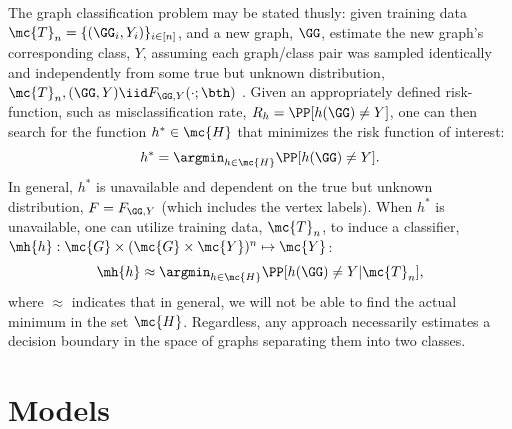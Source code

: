 \documentclass[10pt,journal,cspaper,compsoc]{IEEEtran}
\begin{document}
The graph classification problem may be stated thusly: given training data $\mc{T}_n=\{(\GG_i,Y_i)\}_{i \in [n]}$, and a new graph, $\GG$, estimate the new graph's corresponding class, $Y$, assuming each graph/class pair was sampled identically and independently from some true but unknown distribution, $\mc{T}_n,(\GG,Y) \iid F_{\GG,Y}(\cdot; \bth)$ .  Given an appropriately defined risk-function, such as misclassification rate, $R_h=\PP[h(\GG) \neq Y]$, one can then search for the function $h^* \in \mc{H}$ that minimizes the risk function of interest:
\begin{align}
	h^* = \argmin_{h \in \mc{H}} \PP[h(\GG) \neq Y].
\end{align}
In general, $h^*$ is unavailable and dependent on the true but unknown distribution,  $F=F_{\GG,Y}$ (which includes the vertex labels).  When $h^*$ is unavailable, one can utilize training data, $\mc{T}_n$, to induce a classifier, $\mh{h}: \mc{G} \times (\mc{G}\times\mc{Y})^n \mapsto \mc{Y}$:
\begin{align}
	\mh{h} \approx \argmin_{h \in \mc{H}} \PP[h(\GG) \neq Y | \mc{T}_n],
\end{align}
where $\approx$ indicates that in general, we will not be able to find the actual minimum in the set $\mc{H}$. Regardless, any approach necessarily estimates a decision boundary in the space of graphs separating them into two classes.  %




\section{Models}
\end{document}
